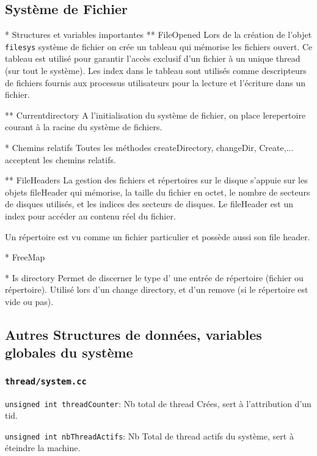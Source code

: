 \documentclass[11pt]{article}
\theoremstyle{definition}
\theoremstyle{definition}
\begin{document}
\subsection{Système de Fichier}

* Structures et variables importantes 
** FileOpened 
Lors de la création de l'objet \texttt{filesys} système de fichier on crée un tableau qui mémorise les fichiers ouvert. Ce tableau est utilisé pour garantir l'accès exclusif d'un fichier à un unique thread (sur tout le système). Les index dans le tableau sont utilisés comme descripteurs de fichiers fournis aux processus utilisateurs pour la lecture et l'écriture dans un fichier.


** Currentdirectory
A l'initialisation du système de fichier, on place lerepertoire courant à la racine du système de fichiers.

* Chemins relatifs
Toutes les méthodes createDirectory, changeDir, Create,... acceptent les chemins relatifs.

** FileHeaders
La gestion des fichiers et répertoires sur le disque s'appuie sur les objets fileHeader qui mémorise,
la taille du fichier en octet, le nombre de secteurs de disques utilisés, et les indices des secteurs de disques.
Le fileHeader est un index pour accéder au contenu réel du fichier.


Un répertoire est vu comme un fichier particulier et possède aussi son file header.
 
* FreeMap

* Is directory
Permet de discerner le type d' une entrée de répertoire (fichier ou répertoire).
Utilisé lors d'un change directory, et d'un remove (si le répertoire est vide ou pas).

\subsection{Autres Structures de données, variables globales du système}
\subsubsection{\texttt{thread/system.cc}}
\texttt{unsigned int threadCounter}: Nb total de thread Crées, sert à l'attribution d'un tid.

\texttt{unsigned int nbThreadActifs}: Nb Total de thread actifs du système, sert à éteindre la machine.
\end{document}
